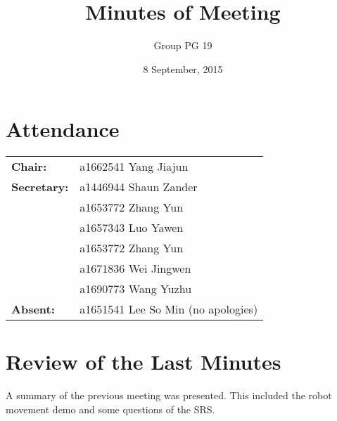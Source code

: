 \documentclass[a4paper]{article}
\title{Minutes of Meeting}
\author{Group PG 19}
\date{8 September, 2015}
\begin{document}
\maketitle
\section*{Attendance}
\begin{tabular}{l l}
\textbf{Chair:} 
&a1662541 Yang Jiajun\\
\textbf{Secretary:}&a1446944 Shaun Zander\\
&a1653772 Zhang Yun\\
&a1657343 Luo Yawen\\
&a1653772 Zhang Yun\\
&a1671836 Wei Jingwen\\
&a1690773 Wang Yuzhu\\
\textbf{Absent:}&a1651541 Lee So Min (no apologies)
\end{tabular}

\section{Review of the Last Minutes}
A summary of the previous meeting was presented. This included the robot movement demo and some questions of the SRS.
\end{document}
